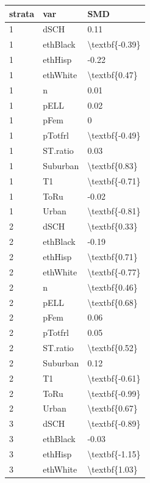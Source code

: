 \documentclass[man,floatsintext]{apa6}
\begin{document}
\begin{table}[H]
\centering
\begin{tabular}{l|l|l}
\hline
strata & var & SMD\\
\hline
1 & dSCH & 0.11\\
\hline
1 & ethBlack & \textbackslash{}textbf\{-0.39\}\\
\hline
1 & ethHisp & -0.22\\
\hline
1 & ethWhite & \textbackslash{}textbf\{0.47\}\\
\hline
1 & n & 0.01\\
\hline
1 & pELL & 0.02\\
\hline
1 & pFem & 0\\
\hline
1 & pTotfrl & \textbackslash{}textbf\{-0.49\}\\
\hline
1 & ST.ratio & 0.03\\
\hline
1 & Suburban & \textbackslash{}textbf\{0.83\}\\
\hline
1 & T1 & \textbackslash{}textbf\{-0.71\}\\
\hline
1 & ToRu & -0.02\\
\hline
1 & Urban & \textbackslash{}textbf\{-0.81\}\\
\hline
2 & dSCH & \textbackslash{}textbf\{0.33\}\\
\hline
2 & ethBlack & -0.19\\
\hline
2 & ethHisp & \textbackslash{}textbf\{0.71\}\\
\hline
2 & ethWhite & \textbackslash{}textbf\{-0.77\}\\
\hline
2 & n & \textbackslash{}textbf\{0.46\}\\
\hline
2 & pELL & \textbackslash{}textbf\{0.68\}\\
\hline
2 & pFem & 0.06\\
\hline
2 & pTotfrl & 0.05\\
\hline
2 & ST.ratio & \textbackslash{}textbf\{0.52\}\\
\hline
2 & Suburban & 0.12\\
\hline
2 & T1 & \textbackslash{}textbf\{-0.61\}\\
\hline
2 & ToRu & \textbackslash{}textbf\{-0.99\}\\
\hline
2 & Urban & \textbackslash{}textbf\{0.67\}\\
\hline
3 & dSCH & \textbackslash{}textbf\{-0.89\}\\
\hline
3 & ethBlack & -0.03\\
\hline
3 & ethHisp & \textbackslash{}textbf\{-1.15\}\\
\hline
3 & ethWhite & \textbackslash{}textbf\{1.03\}\\

\end{tabular}
\end{table}
\end{document}
